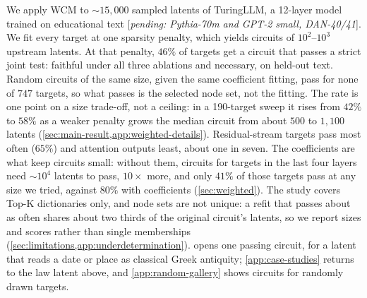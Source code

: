 \documentclass[10pt]{article}
\newcommand{\pending}[1]{\textcolor{red!70!black}{[\textit{pending: #1}]}}
\begin{document}
We apply WCM to ${\sim}15{,}000$ sampled latents of TuringLLM, a 12-layer model trained on educational text \pending{Pythia-70m and GPT-2 small, DAN-40/41}.
We fit every target at one sparsity penalty, which yields circuits of $10^{2}$--$10^{3}$ upstream latents.
At that penalty, $46\%$ of targets get a circuit that passes a strict joint test: faithful under all three ablations and necessary, on held-out text.
Random circuits of the same size, given the same coefficient fitting, pass for none of $747$ targets, so what passes is the selected node set, not the fitting.
The rate is one point on a size trade-off, not a ceiling: in a 190-target sweep it rises from $42\%$ to $58\%$ as a weaker penalty grows the median circuit from about $500$ to $1{,}100$ latents (\cref{sec:main-result,app:weighted-details}).
Residual-stream targets pass most often ($65\%$) and attention outputs least, about one in seven.
The coefficients are what keep circuits small: without them, circuits for targets in the last four layers need ${\sim}10^{4}$ latents to pass, $10\times$ more, and only $41\%$ of those targets pass at any size we tried, against $80\%$ with coefficients (\cref{sec:weighted}).
The study covers Top-K dictionaries only, and node sets are not unique: a refit that passes about as often shares about two thirds of the original circuit's latents, so we report sizes and scores rather than single memberships (\cref{sec:limitations,app:underdetermination}).
 opens one passing circuit, for a latent that reads a date or place as classical Greek antiquity; \cref{app:case-studies} returns to the law latent above, and \cref{app:random-gallery} shows circuits for randomly drawn targets.
\end{document}
